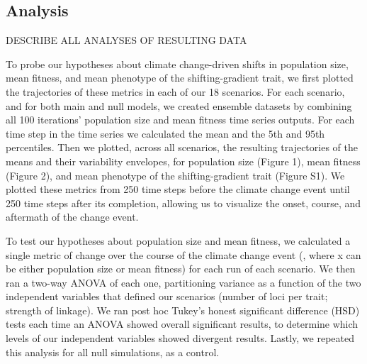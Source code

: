 \documentclass[9pt,twocolumn,twoside,lineno]{pnas-new}
\begin{document}
{\subsection*{Analysis}

DESCRIBE ALL ANALYSES OF RESULTING DATA

To probe our hypotheses about climate change-driven shifts in population size, 
mean fitness, and mean phenotype of the shifting-gradient trait, we first plotted the 
trajectories of these metrics in each of our 18 scenarios. For each scenario, and 
for both main and null models, we created ensemble datasets by combining all 100 
iterations’ population size and mean fitness time series outputs. For each time step 
in the time series we calculated the mean and the 5th and 95th percentiles. Then we 
plotted, across all scenarios, the resulting trajectories of the means and their 
variability envelopes, for population size (Figure 1), mean fitness (Figure 2), and 
mean phenotype of the shifting-gradient trait (Figure S1). We plotted these metrics 
from 250 time steps before the climate change event until 250 time steps after 
its completion, allowing us to visualize the onset, course, and aftermath of the 
change event. 


To test our hypotheses about population size and mean fitness, we calculated a single 
metric of change over the course of the climate change event (, where x can be 
either population size or mean fitness) for each run of each scenario. We then ran a 
two-way ANOVA of each one, partitioning variance as a function of the two independent 
variables that defined our scenarios (number of loci per trait; strength of linkage). 
We ran post hoc Tukey’s honest significant difference (HSD) tests each time an ANOVA 
showed overall significant results, to determine which levels of our independent 
variables showed divergent results. Lastly, we repeated this analysis for all null 
simulations, as a control.


}
\end{document}
